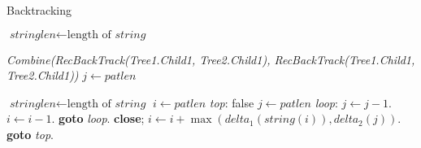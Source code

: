 \begin{algorithm}
	\caption{Backtracking}\label{euclid}
	\begin{algorithmic}[1]
		
		\State $\textit{stringlen} \gets \text{length of }\textit{string}$
		
		 \Return \textit{Combine(RecBackTrack(Tree1.Child1, Tree2.Child1), RecBackTrack(Tree1.Child1, Tree2.Child1))}
		\EndIf
		\State $j \gets \textit{patlen}$
		
		
		
		
		\State $\textit{stringlen} \gets \text{length of }\textit{string}$
		\State $i \gets \textit{patlen}$
		\BState \emph{top}:
		 \Return false
		\EndIf
		\State $j \gets \textit{patlen}$
		\BState \emph{loop}:
		\State $j \gets j-1$.
		\State $i \gets i-1$.
		\State \textbf{goto} \emph{loop}.
		\State \textbf{close};
		\EndIf
		\State $i \gets i+\max(\textit{delta}_1(\textit{string}(i)),\textit{delta}_2(j))$.
		\State \textbf{goto} \emph{top}.
		\EndProcedure
	\end{algorithmic}
\end{algorithm}


